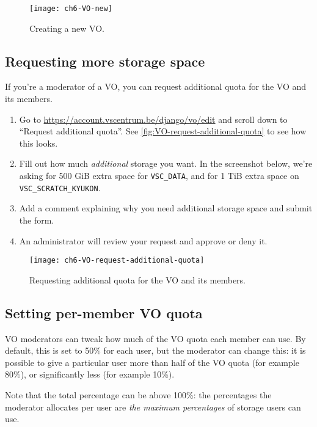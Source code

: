 \begin{figure}[!htbp]
  \caption{Creating a new VO.}
  \centering
    \texttt{[image: ch6-VO-new]}
\end{figure}\label{fig:VO-new}

\subsection{Requesting more storage space}
\label{subsec:requesting-more-storage-space}

If you're a moderator of a VO, you can request additional quota for the VO and
its members.

\begin{enumerate}
    \item Go to \url{https://account.vscentrum.be/django/vo/edit} and scroll down
        to ``Request additional quota''. See \autoref{fig:VO-request-additional-quota} to see how this looks.
    \item Fill out how much \emph{additional} storage you want. In the screenshot below,
        we're asking for 500 GiB extra space for \lstinline|VSC_DATA|, and for 1 TiB extra
        space on \lstinline|VSC_SCRATCH_KYUKON|.
    \item Add a comment explaining why you need additional storage space and submit
        the form.
    \item An \hpc administrator will review your request and approve or deny it.
\end{enumerate}

\begin{figure}[!htbp]
  \caption{Requesting additional quota for the VO and its members.}
  \centering
    \texttt{[image: ch6-VO-request-additional-quota]}
\end{figure}\label{fig:VO-request-additional-quota}

\subsection{Setting per-member VO quota}

VO moderators can tweak how much of the VO quota each member can use. By default,
this is set to 50\% for each user, but the moderator can change this: it is possible
to give a particular user more than half of the VO quota (for example 80\%), or
significantly less (for example 10\%).

Note that the total percentage can be above 100\%: the percentages the moderator
allocates per user are \emph{the maximum percentages} of storage users can use.

